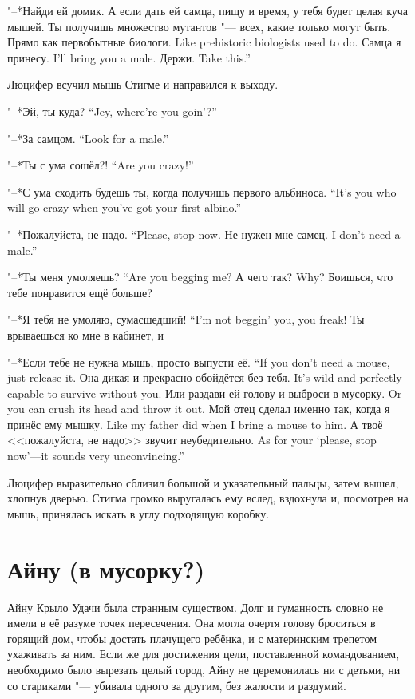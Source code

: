 "--*Найди ей домик.
А если дать ей самца, пищу и время, у тебя будет целая куча мышей.
Ты получишь множество мутантов "--- всех, какие только могут быть.
{Прямо как первобытные биологи.}
{Like prehistoric biologists used to do.}
{Самца я принесу.}
{I'll bring you a male.}
{Держи.}
{Take this.''}

Люцифер всучил мышь Стигме и направился к выходу.

{"--*Эй, ты куда?}
{``Jey, where're you goin'?''}

{"--*За самцом.}
{``Look for a male.''}

{"--*Ты с ума сошёл?!}
{``Are you crazy!''}

{"--*С ума сходить будешь ты, когда получишь первого альбиноса.}
{``It's you who will go crazy when you've got your first albino.''}

{"--*Пожалуйста, не надо.}
{``Please, stop now.}
{Не нужен мне самец.}
{I don't need a male.''}

{"--*Ты меня умоляешь?}
{``Are you begging me?}
{А чего так?}
{Why?}
Боишься, что тебе понравится ещё больше?

{"--*Я тебя не умоляю, сумасшедший!}
{``I'm not beggin' you, you freak!}
Ты врываешься ко мне в кабинет, и\ldotst

{"--*Если тебе не нужна мышь, просто выпусти её.}
{``If you don't need a mouse, just release it.}
{Она дикая и прекрасно обойдётся без тебя.}
{It's wild and perfectly capable to survive without you.}
{Или раздави ей голову и выброси в мусорку.}
{Or you can crush its head and throw it out.}
{Мой отец сделал именно так, когда я принёс ему мышку.}
{Like my father did when I bring a mouse to him.}
{А твоё <<пожалуйста, не надо>> звучит неубедительно.}
{As for your `please, stop now'---it sounds very unconvincing.''}

Люцифер выразительно сблизил большой и указательный пальцы, затем вышел, хлопнув дверью.
Стигма громко выругалась ему вслед, вздохнула и, посмотрев на мышь, принялась искать в углу подходящую коробку.

\section{Айну (в мусорку?)}

Айну Крыло Удачи была странным существом.
Долг и гуманность словно не имели в её разуме точек пересечения.
Она могла очертя голову броситься в горящий дом, чтобы достать плачущего ребёнка, и с материнским трепетом ухаживать за ним.
Если же для достижения цели, поставленной командованием, необходимо было вырезать целый город, Айну не церемонилась ни с детьми, ни со стариками "--- убивала одного за другим, без жалости и раздумий.

